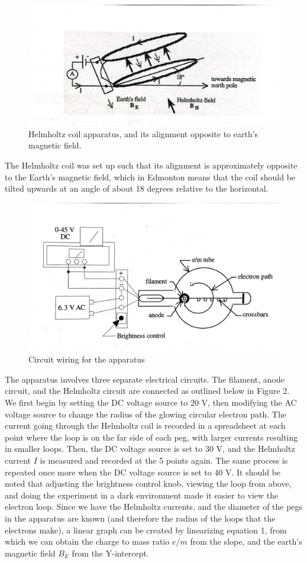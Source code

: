 \documentclass[letterpaper]{article}
\begin{document}
\begin{figure}[h!]
    \centering
    \includegraphics[width=\textwidth]{fig1.jpg}
    \caption{Helmholtz coil apparatus, and its alignment opposite to earth's magnetic field. \cite{labmanual}}
\end{figure}

The Helmholtz coil was set up such that its alignment is approximately
opposite to the Earth's magnetic field, which in Edmonton means that the coil
should be tilted upwards at an angle of about 18 degrees relative to the horizontal.
\begin{figure}[h!]
    \centering
    \includegraphics[width=.9\textwidth]{fig2.jpg}
    \caption{Circuit wiring for the apparatus \cite{labmanual}}
\end{figure}
The apparatus involves three separate electrical circuits.
The filament, anode circuit, and the Helmholtz circuit are connected as outlined
below in Figure 2. We first begin by setting the DC voltage source to 20 V, then modifying the
AC voltage source to change the radius of the glowing circular electron path. The current going through the
Helmholtz coil is recorded in a spreadsheet at each point where the loop is on the far side of each peg, with larger
currents resulting in smaller loops. Then,
the DC voltage source is set to 30 V, and the Helmholtz current $I$ is measured and recorded at the 5 points again.
The same process is repeated once more when the DC voltage source is set to 40 V. It should be noted
that adjusting the brightness control knob, viewing the loop from above, and doing the experiment in a dark
environment made it easier to view the electron loop.
Since we have the Helmholtz currents, and the diameter of the pegs in the apparatus are known (and therefore
the radius of the loops that the electrons make), a linear graph can be created by linearizing equation 1,
from which we can obtain the charge to mass ratio $e/m$ from the slope, and the earth's magnetic field $B_E$
from the Y-intercept.
\end{document}
